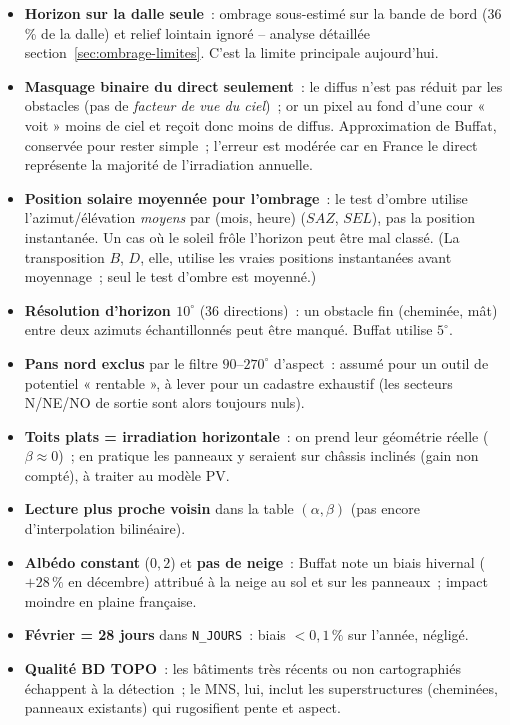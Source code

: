 \documentclass[11pt,a4paper]{article}
\newcommand{\fonction}[1]{\texttt{#1}}
\begin{document}
\begin{itemize}
  \item \textbf{Horizon sur la dalle seule}~: ombrage sous-estimé sur la bande de
    bord (36\,\% de la dalle) et relief lointain ignoré -- analyse détaillée
    section~\ref{sec:ombrage-limites}. C'est la limite principale aujourd'hui.
  \item \textbf{Masquage binaire du direct seulement}~: le diffus n'est pas réduit
    par les obstacles (pas de \emph{facteur de vue du ciel})~; or un pixel au fond
    d'une cour « voit » moins de ciel et reçoit donc moins de diffus. Approximation
    de Buffat, conservée pour rester simple~; l'erreur est modérée car en France le
    direct représente la majorité de l'irradiation annuelle.
  \item \textbf{Position solaire moyennée pour l'ombrage}~: le test d'ombre
    utilise l'azimut/élévation \emph{moyens} par (mois, heure) ($SAZ$, $SEL$), pas
    la position instantanée. Un cas où le soleil frôle l'horizon peut être mal
    classé. (La transposition $B$, $D$, elle, utilise les vraies positions
    instantanées avant moyennage~; seul le test d'ombre est moyenné.)
  \item \textbf{Résolution d'horizon $10^\circ$} (36 directions)~: un obstacle fin
    (cheminée, mât) entre deux azimuts échantillonnés peut être manqué. Buffat
    utilise $5^\circ$.
  \item \textbf{Pans nord exclus} par le filtre $90$--$270^\circ$ d'aspect~: assumé
    pour un outil de potentiel « rentable », à lever pour un cadastre exhaustif
    (les secteurs N/NE/NO de sortie sont alors toujours nuls).
  \item \textbf{Toits plats = irradiation horizontale}~: on prend leur géométrie
    réelle ($\beta\approx0$)~; en pratique les panneaux y seraient sur châssis
    inclinés (gain non compté), à traiter au modèle PV.
  \item \textbf{Lecture plus proche voisin} dans la table $(\alpha,\beta)$ (pas
    encore d'interpolation bilinéaire).
  \item \textbf{Albédo constant} ($0{,}2$) et \textbf{pas de neige}~: Buffat note
    un biais hivernal ($+28\,\%$ en décembre) attribué à la neige au sol et sur les
    panneaux~; impact moindre en plaine française.
  \item \textbf{Février = 28 jours} dans \fonction{N\_JOURS}~: biais $< 0{,}1\,\%$
    sur l'année, négligé.
  \item \textbf{Qualité BD TOPO}~: les bâtiments très récents ou non cartographiés
    échappent à la détection~; le MNS, lui, inclut les superstructures (cheminées,
    panneaux existants) qui rugosifient pente et aspect.
\end{itemize}
\end{document}
